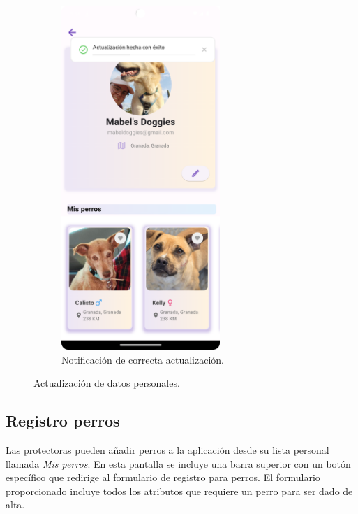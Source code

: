 \documentclass[a4paper, 12pt]{article}
\begin{document}
\begin{figure}[H]
\begin{subfigure}{0.48\textwidth}
\begin{center}
			{\includegraphics[width=6cm]{app/UserUpdateSuccess.png}\par}
			\caption{Notificación de correcta actualización.}
		\end{center}  
	\end{subfigure}\hfill
	\caption{Actualización de datos personales.}
\end{figure}


\newpage
\subsection*{Registro perros}

Las protectoras pueden añadir perros a la aplicación desde su lista personal llamada \textit{Mis perros}. En esta pantalla se incluye una barra superior con un botón específico que redirige al formulario de registro para perros. El formulario proporcionado incluye todos los atributos que requiere un perro para ser dado de alta.
\end{document}

